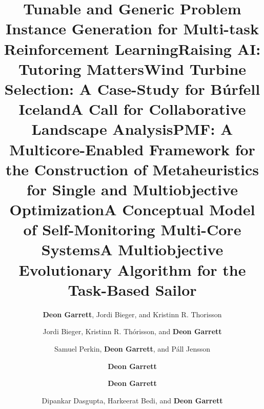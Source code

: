 \documentclass[a4paper,10pt]{cvclean}
\begin{document}
\begin{publications}
  \begin{conferencepapers}
    \begin{paper}
      \title{Tunable and Generic Problem Instance Generation for Multi-task
        Reinforcement Learning}
      \author{\textbf{Deon Garrett}, Jordi Bieger, and Kristinn R. Thorisson}
    \end{paper}
    \begin{paper}
      \title{Raising AI: Tutoring Matters}
      \author{Jordi Bieger, Kristinn R. Thórisson, and \textbf{Deon Garrett}}
    \end{paper}
    \begin{paper}
      \title{Wind Turbine Selection: A Case-Study for Búrfell Iceland}
      \author{Samuel Perkin, \textbf{Deon Garrett}, and Páll Jensson}
    \end{paper}
    \begin{paper}
      \title{A Call for Collaborative Landscape Analysis}
      \author{\textbf{Deon Garrett}}
    \end{paper}
    \begin{paper}
      \title{PMF: A Multicore-Enabled Framework for the Construction of
        Metaheuristics for Single and Multiobjective Optimization}
      \author{\textbf{Deon Garrett}}
    \end{paper}
    \begin{paper}
      \title{A Conceptual Model of Self-Monitoring Multi-Core Systems}
      \author{Dipankar Dasgupta, Harkeerat Bedi, and \textbf{Deon Garrett}}
    \end{paper}
    \begin{paper}
      \title{A Multiobjective Evolutionary Algorithm for the Task-Based Sailor
}
\end{paper}
\end{conferencepapers}
\end{publications}
\end{document}
